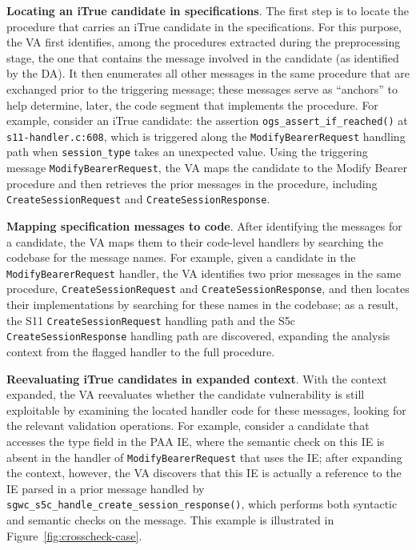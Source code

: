 \vspace{2pt}\noindent\textbf{Locating an iTrue candidate in specifications}. 
The first step is to locate the procedure that carries an iTrue candidate in the specifications. For this purpose, the VA first identifies, among the procedures extracted during the preprocessing stage, the one that contains the message involved in the candidate (as identified by the DA). It then enumerates all other messages in the same procedure that are exchanged prior to the triggering message; these messages serve as ``anchors'' to help determine, later, the code segment that implements the procedure. 
For example, consider an iTrue candidate: the assertion \texttt{ogs\_assert\_if\_reached()} at \texttt{s11-handler.c:608}, which is triggered along the \texttt{ModifyBearerRequest} handling path when \texttt{session\_type} takes an unexpected value. Using the triggering message \texttt{ModifyBearerRequest}, the VA maps the candidate to the Modify Bearer procedure and then retrieves the prior messages in the procedure, including \texttt{CreateSessionRequest} and \texttt{CreateSessionResponse}.

\vspace{2pt}\noindent\textbf{Mapping specification messages to code}. 
After identifying the messages for a candidate, the VA maps them to their code-level handlers by searching the codebase for the message names.
For example, given a candidate in the \texttt{ModifyBearerRequest} handler, the VA identifies two prior messages in the same procedure, \texttt{CreateSessionRequest} and \texttt{CreateSessionResponse}, and then locates their implementations by searching for these names in the codebase; as a result, the S11 \texttt{CreateSessionRequest} handling path and the S5c \texttt{CreateSessionResponse} handling path are discovered, expanding the analysis context from the flagged handler to the full procedure.

\vspace{2pt}\noindent\textbf{Reevaluating iTrue candidates in expanded context}. 
With the context expanded, the VA reevaluates whether the candidate vulnerability is still exploitable by examining the located handler code for these messages, looking for the relevant validation operations.
For example, consider a candidate that accesses the type field in the PAA IE, where the semantic check on this IE is absent in the handler of \texttt{ModifyBearerRequest} that uses the IE; after expanding the context, however, the VA discovers that this IE is actually a reference to the IE parsed in a prior message handled by \texttt{sgwc\_s5c\_handle\_create\_session\_response()}, which performs both syntactic and semantic checks on the message. This example is illustrated in Figure~\ref{fig:crosscheck-case}. 



